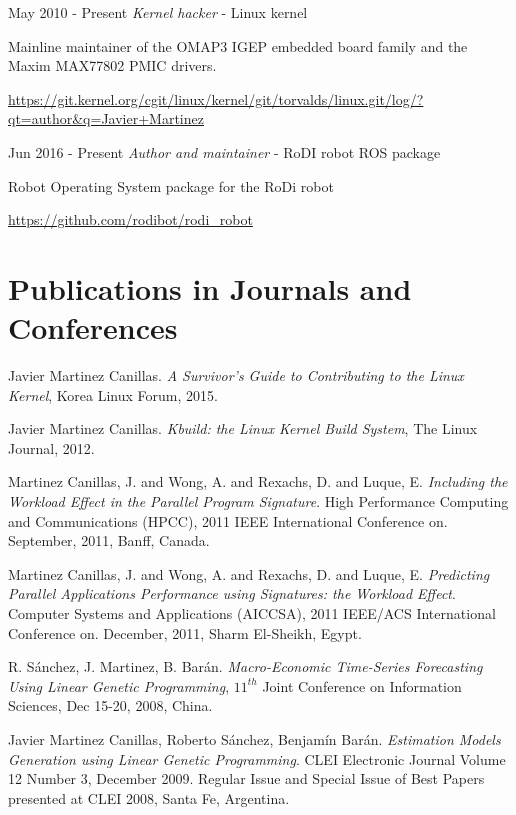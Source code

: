 \documentclass{simplecv}
\begin{document}
\begin{topic}

\item[May 2010 - Present] \emph{Kernel hacker} - Linux kernel

Mainline maintainer of the OMAP3 IGEP embedded board family and the Maxim MAX77802 PMIC drivers.

\url{https://git.kernel.org/cgit/linux/kernel/git/torvalds/linux.git/log/?qt=author&q=Javier+Martinez}

\item[Jun 2016 - Present] \emph{Author and maintainer} - RoDI robot ROS package

Robot Operating System package for the RoDi robot

\url{https://github.com/rodibot/rodi_robot}

\end{topic}

\section{Publications in Journals and Conferences}

\begin{thebibliography}{10}

\footnotesize

Javier Martinez Canillas. \emph{A Survivor's Guide to Contributing to the Linux Kernel}, Korea Linux Forum, 2015.

Javier Martinez Canillas. \emph{Kbuild: the Linux Kernel Build System}, The Linux Journal, 2012. 

Martinez Canillas, J. and Wong, A. and Rexachs, D. and Luque, E. \emph{Including the Workload Effect in the Parallel Program Signature}. High Performance Computing and Communications (HPCC), 2011 IEEE International Conference on. September, 2011, Banff, Canada.

Martinez Canillas, J. and Wong, A. and Rexachs, D. and Luque, E. \emph{Predicting Parallel Applications Performance using Signatures: the Workload Effect}. Computer Systems and Applications (AICCSA), 2011 IEEE/ACS International Conference on. December, 2011, Sharm El-Sheikh, Egypt.

R. Sánchez, J. Martinez, B. Barán. \emph{Macro-Economic Time-Series Forecasting Using Linear Genetic Programming}, $11^{th}$ Joint Conference on Information Sciences, Dec 15-20, 2008, China. 

Javier Martinez Canillas, Roberto Sánchez, Benjamín Barán. \emph{Estimation Models Generation using Linear Genetic Programming}. CLEI Electronic Journal Volume 12 Number 3, December 2009. Regular Issue and Special Issue of Best Papers presented at CLEI 2008, Santa Fe, Argentina.

\end{thebibliography}
\end{document}
